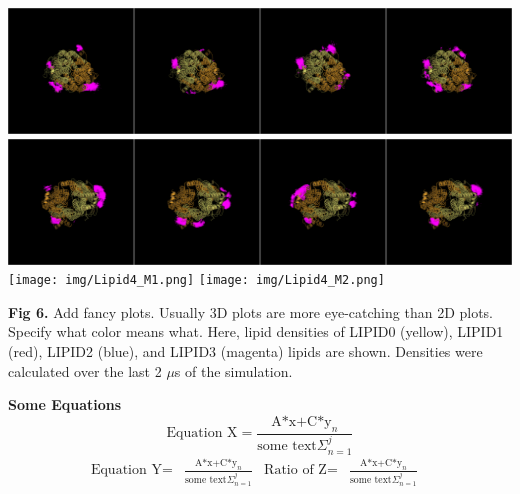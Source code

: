 \documentclass[a0,final,landscape]{a0poster}
\begin{document}
\begin{minipage}[c][-30cm]{0.3\textwidth}
\vspace{0.4cm} \includegraphics[scale=0.05]{img/Lipid3_M1.png}  \hspace{1cm} 
\includegraphics[scale=0.05]{img/Lipid3_M2.png}  \\ \vspace{0.1cm}
\vspace{0.4cm} \texttt{[image: img/Lipid4\_M1.png]} \hspace{1cm}
\texttt{[image: img/Lipid4\_M2.png]}
\begin{center}
\small{\textbf{Fig 6.} Add fancy plots. Usually 3D plots are more eye-catching than 2D plots. Specify what color means what. Here, lipid densities of LIPID0 (yellow), LIPID1 (red), LIPID2 (blue), and LIPID3 (magenta) lipids are shown. Densities were calculated over the last 2 $\mu$s of the simulation.}
\end{center}

\LARGE \textbf{Some Equations} \\
\vspace{-1cm}
\large
\begin{equation*}
\text{Equation X}=\frac{\text{A*x+C*y}_{n}}{\text{some text} \Sigma_{n=1}^{j}} 
\end{equation*}
\vspace{-1cm}
\begin{align*}
\text{Equation Y}=&\frac{\text{A*x+C*y}_{n}}{\text{some text} \Sigma_{n=1}^{j}} & \text{Ratio of Z}=&\frac{\text{A*x+C*y}_{n}}{\text{some text} \Sigma_{n=1}^{j}} &
\end{align*}
\vspace{-1cm}


\end{minipage}
\end{document}
